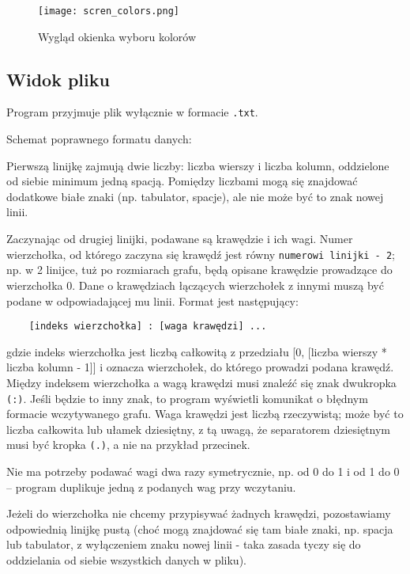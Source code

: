 \documentclass[]{article}
\begin{document}
\begin{figure}[H]
\begin{center}
  \texttt{[image: scren\_colors.png]}
  \end{center}
  \caption{Wygląd okienka wyboru kolorów}
  \label{fig:graf}
\end{figure}

\subsection{Widok pliku}

Program przyjmuje plik wyłącznie w formacie \texttt{.txt}.

Schemat poprawnego formatu danych:

Pierwszą linijkę zajmują dwie liczby: liczba wierszy i liczba kolumn, oddzielone od siebie minimum jedną spacją. Pomiędzy liczbami mogą się znajdować dodatkowe białe znaki (np. tabulator, spacje), ale nie może być to znak nowej linii.

Zaczynając od drugiej linijki, podawane są krawędzie i ich wagi. Numer wierzchołka, od którego zaczyna się krawędź jest równy \texttt{numerowi linijki - 2}; np. w 2 linijce, tuż po rozmiarach grafu, będą opisane krawędzie prowadzące do wierzchołka 0. Dane o krawędziach łączących wierzchołek z innymi muszą być podane w odpowiadającej mu linii. Format jest następujący:
\begin{verbatim}
    [indeks wierzchołka] : [waga krawędzi] ...
\end{verbatim}
gdzie indeks wierzchołka jest liczbą całkowitą z przedziału [0, [liczba wierszy * liczba kolumn - 1]] i oznacza wierzchołek, do którego prowadzi podana krawędź. Między indeksem wierzchołka a wagą krawędzi musi znaleźć się znak dwukropka \texttt{(:)}. Jeśli będzie to inny znak, to program wyświetli komunikat o błędnym formacie wczytywanego grafu. Waga krawędzi jest liczbą rzeczywistą; może być to liczba całkowita lub ułamek dziesiętny, z tą uwagą, że separatorem dziesiętnym musi być kropka \texttt{(.)}, a nie na przykład przecinek.

Nie ma potrzeby podawać wagi dwa razy symetrycznie, np. od 0 do 1 i od 1 do 0 – program duplikuje jedną z podanych wag przy wczytaniu.

Jeżeli do wierzchołka nie chcemy przypisywać żadnych krawędzi, pozostawiamy odpowiednią linijkę pustą (choć mogą znajdować się tam białe znaki, np. spacja lub tabulator, z wyłączeniem znaku nowej linii - taka zasada tyczy się do oddzielania od siebie wszystkich danych w pliku).
\end{document}
